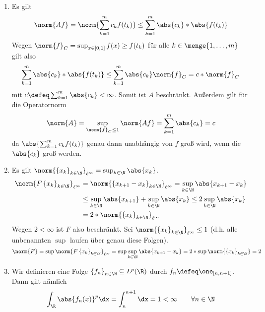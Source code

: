 \begin{exercisePage}
	\begin{enumerate}[label=(zu \alph*), leftmargin=\zulength]
		\item Es gilt
		\begin{equation*}
			\norm{Af} = \norm{\sum_{k=1}^m c_k f(t_k)} \le \sum_{k=1}^m \abs{c_k} * \abs{f(t_k)}
		\end{equation*}
		Wegen $\norm{f}_C = \sup_{x \in [0,1]} f(x) \ge f(t_k)$ für alle $k \in \menge{1, \dots, m}$ gilt also
		\begin{equation*}
			\sum_{k=1}^m \abs{c_k} * \abs{f(t_k)} \le \sum_{k=1}^m \abs{c_k} \norm{f}_C = c * \norm{f}_C
		\end{equation*}
		mit $c \defeq \sum_{k=1}^m \abs{c_k} < \infty$. Somit ist $A$ beschränkt. Außerdem gilt für die Operatornorm
		\begin{equation*}
			\norm{A} = \sup_{\norm{f}_C \le 1} \norm{Af} = \sum_{k=1}^m \abs{c_k} = c
		\end{equation*} 
		da $\abs{\sum_{k=1}^m c_k f(t_k)}$ genau dann unabhängig von $f$ groß wird, wenn die $\abs{c_k}$ groß werden.
		\item Es gilt $\norm{\folge{x_k}{k \in \N}}_{\ell^\infty} = \sup_{k \in \N} \abs{x_k}$. 
		\begin{equation*}
			\begin{aligned}
				\norm{F \folge{x_k}{k \in \N}}_{\ell^\infty} 
				&= \norm{\folge{x_{k+1} - x_k}{k \in \N}}_{\ell^\infty} 
				= \sup_{k \in \N} \abs{x_{k+1} - x_k} \\
				&\le \sup_{k \in \N} \abs{x_{k+1}} + \sup_{k \in \N} \abs{x_k} 
				\le 2\sup_{k \in \N}  \abs{x_k} \\
				&= 2 * \norm{\folge{x_k}{k \in \N}}_{\ell^\infty}
			\end{aligned}
		\end{equation*}
		Wegen $2 < \infty$ ist $F$ also beschränkt. Sei $\norm{\folge{x_k}{k \in \N}}_{\ell^\infty} \le 1$ (d.h. alle unbenannten $\sup$ laufen über genau diese Folgen).
		\begin{equation*}
			\norm{F} 
			= \sup \norm{ F \folge{x_k}{k \in \N}}_{\ell^\infty}
			=\sup \sup_{k \in \N} \abs{ x_{k+1} - x_k} 
			= 2 * \sup \norm{\folge{x_k}{k \in \N}}
			= 2
		\end{equation*}
		\item Wir definieren eine Folge $\folge{f_n}{n \in \N} \subseteq L^p(\R)$ durch $f_n \defeq \one_{[n,n+1]}$. Dann gilt nämlich
		\begin{equation*}
			\int_\R \abs{f_n(x)}^p \dx = \int_n^{n+1} \dx = 1 < \infty \qquad \forall n \in \N

\end{equation*}
\end{enumerate}
\end{exercisePage}
